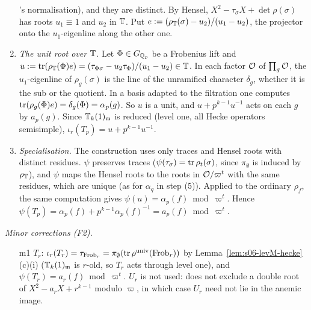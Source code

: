 \begin{remark}[$M=1$: the $T_p$ matching, minor corrections, status after the second reading]
\begin{enumerate}[label=(\roman*)]
  \cite{KO}'s normalisation), and they are distinct. By Hensel, $X^2-\tau_\sigma X+\det\rho(\sigma)$ has roots $u_1\equiv1$ and $u_2$ in $\T$. Put
  $e:=(\rho_\T(\sigma)-u_2)/(u_1-u_2)$, the projector onto the $u_1$-eigenline along the other one.
\item \emph{The unit root over $\T$.} Let $\Phi\in G_{\mathbb{Q}_p}$ be a Frobenius lift and $u:=\operatorname{tr}(\rho_{\mathbb{T}}(\Phi)e)=(\tau_{\Phi\sigma}-u_2\tau_\Phi)/(u_1-u_2)\in\mathbb{T}$.
  In each factor $\mathcal{O}$ of $\prod_g\mathcal{O}$, the $u_1$-eigenline of $\rho_g(\sigma)$ is the line of the unramified character $\delta_g$, whether it
  is the sub or the quotient. In a basis adapted to the filtration one computes $\operatorname{tr}(\rho_g(\Phi)e)=\delta_g(\Phi)=\alpha_p(g)$. So $u$ is a
  unit, and $u+p^{k-1}u^{-1}$ acts on each $g$ by $a_p(g)$. Since $\mathbb{T}_k(1)_{\mathfrak{m}}$ is reduced (level one, all Hecke operators semisimple),
  $\iota_r(T_p)=u+p^{k-1}u^{-1}$. \stpmc
\item \emph{Specialisation.} The construction uses only traces and Hensel roots with distinct residues. $\psi$ preserves traces
  ($\psi(\tau_\sigma)=\operatorname{tr}\rho_t(\sigma)$, since $\pi_\emptyset$ is induced by $\rho_{\mathbb{T}}$), and $\psi$ maps the Hensel roots to the roots in
  $\mathcal{O}/\varpi^t$ with the same residues, which are unique (as for $\alpha_q$ in step (5)). Applied to the ordinary $\rho_f$, the same
  computation gives $\psi(u)=\alpha_p(f)\bmod\varpi^t$. Hence $\psi(T_p)=\alpha_p(f)+p^{k-1}\alpha_p(f)^{-1}=a_p(f)\bmod\varpi^t$. \stpmc
\end{enumerate}
\emph{Minor corrections (F2).}
\begin{itemize}
\item[m1] $T_r$: $\iota_r(T_r)=\tau_{\mathrm{Frob}_r}=\pi_\emptyset(\operatorname{tr}\rho^{\rm univ}(\mathrm{Frob}_r))$ by Lemma~\ref{lem:s06-levM-hecke}(c)(i) ($\mathbb{T}_k(1)_{\mathfrak{m}}$ is
  $r$-old, so $T_r$ acts through level one), and $\psi(T_r)=a_r(f)\bmod\varpi^t$. $U_r$ is not used: \cite[(2.2), p.~3]{KO} does not exclude a
  double root of $X^2-a_rX+r^{k-1}$ modulo $\varpi$, in which case $U_r$ need not lie in the anemic image.


\end{itemize}
\end{remark}
